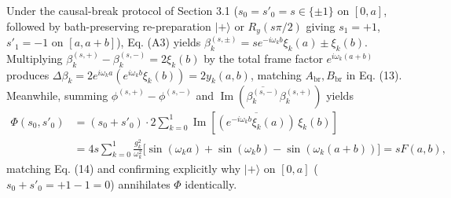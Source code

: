 \documentclass[11pt,letterpaper]{article}
\theoremstyle{definition}
\begin{document}
Under the causal-break protocol of Section 3.1
(\(s_0 = s'_0 = s \in \{\pm 1\}\) on \([0, a]\), followed by
bath-preserving re-preparation \(|+\rangle\) or \(R_y(s\pi/2)\) giving
\(s_1 = +1\), \(s'_1 = -1\) on \([a, a+b]\)), Eq. (A3) yields
\(\beta_k^{(s,\pm)} = s e^{-i\omega_k b}\xi_k(a) \pm \xi_k(b)\).
Multiplying \(\beta_k^{(s,+)} - \beta_k^{(s,-)} = 2\xi_k(b)\) by the
total frame factor \(e^{i\omega_k(a+b)}\) produces
\(\Delta\beta_k = 2 e^{i\omega_k a}(e^{i\omega_k b}\xi_k(b)) = 2 y_k(a,b)\),
matching \(A_{\mathrm{br}}, B_{\mathrm{br}}\) in Eq. (13). Meanwhile,
summing \(\phi^{(s,+)} - \phi^{(s,-)}\) and
\(\operatorname{Im}(\overline{\beta_k^{(s,-)}}\beta_k^{(s,+)})\) yields
\[\begin{aligned}
\Phi(s_0, s'_0) &= (s_0 + s'_0) \cdot 2\sum_{k=0}^{1} \operatorname{Im}\!\left[\overline{\left(e^{-i\omega_k b}\xi_k(a)\right)}\,\xi_k(b)\right] \\
&= 4s\sum_{k=0}^{1} \frac{g_k^2}{\omega_k^2}\Big[\sin(\omega_k a) + \sin(\omega_k b) - \sin(\omega_k(a + b))\Big] = s F(a, b),
\end{aligned}
\tag{B1}\] matching Eq. (14) and confirming explicitly why \(|+\rangle\)
on \([0, a]\) (\(s_0 + s'_0 = +1 - 1 = 0\)) annihilates \(\Phi\)
identically.
\end{document}
